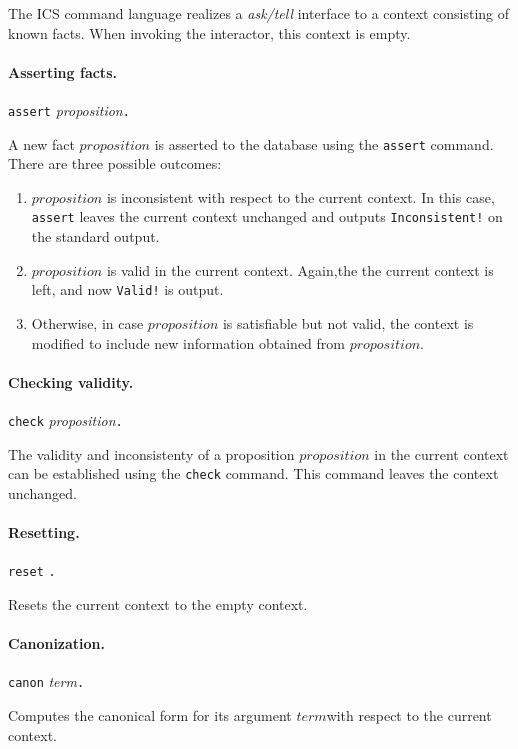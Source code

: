 \documentclass[12pt]{article}
\newcommand{\term}{\textit{term}}
\newcommand{\prop}{\textit{proposition}}
\begin{document}
The ICS command language realizes a {\em ask/tell} interface to
a context consisting of known facts. When invoking
the interactor, this context is empty.

\paragraph{Asserting facts.}
  \begin{center}
  \texttt{assert} \prop \texttt{.}
  \end{center}
A new fact $\prop$ is asserted to the database using the
\texttt{assert} command. There are three possible outcomes:
  \begin{enumerate}
  \item  $\prop$ is inconsistent with respect to the current context.
         In this case, \texttt{assert} leaves the current context
         unchanged and outputs \texttt{Inconsistent!} on the standard
         output.
  \item  $\prop$ is valid in the current context. Again,the
         the current context is left, and now \texttt{Valid!}
         is output.
  \item  Otherwise, in case $\prop$ is satisfiable but not valid,
         the context is modified to include new information obtained
         from $\prop$.
  \end{enumerate}

\paragraph{Checking validity.}
  \begin{center}
  \texttt{check} \prop \texttt{.}
  \end{center}
The validity and inconsistenty of a proposition $\prop$ in the current
context can be established using the \texttt{check} command.  This
command leaves the context unchanged.

\paragraph{Resetting.}
  \begin{center}
  \texttt{reset} \texttt{.}
  \end{center}
Resets the current context to the empty context.

\paragraph{Canonization.}
  \begin{center}
  \texttt{canon} \term \texttt{.}
  \end{center}
Computes the canonical form for its argument $\term$\@ with respect
to the current context.
\end{document}
